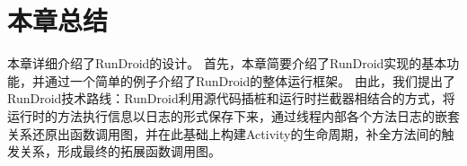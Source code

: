  \section{本章总结}

本章详细介绍了RunDroid的设计。
首先，本章简要介绍了RunDroid实现的基本功能，并通过一个简单的例子介绍了RunDroid的整体运行框架。
由此，我们提出了RunDroid技术路线：RunDroid利用源代码插桩和运行时拦截器相结合的方式，将运行时的方法执行信息以日志的形式保存下来，通过线程内部各个方法日志的嵌套关系还原出函数调用图，并在此基础上构建Activity的生命周期，补全方法间的触发关系，形成最终的拓展函数调用图。
